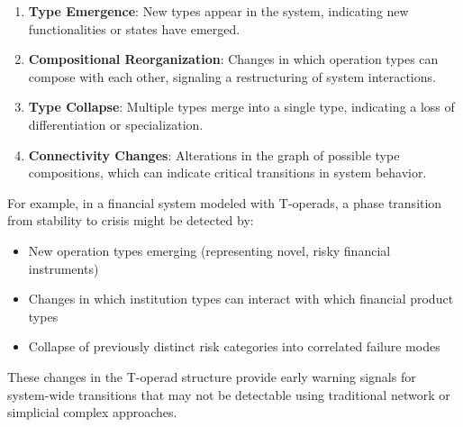 \begin{enumerate}
  \item \textbf{Type Emergence}: New types appear in the system, indicating new functionalities or states have emerged.

  \item \textbf{Compositional Reorganization}: Changes in which operation types can compose with each other, signaling a restructuring of system interactions.

  \item \textbf{Type Collapse}: Multiple types merge into a single type, indicating a loss of differentiation or specialization.

  \item \textbf{Connectivity Changes}: Alterations in the graph of possible type compositions, which can indicate critical transitions in system behavior.
\end{enumerate}

For example, in a financial system modeled with T-operads, a phase transition from stability to crisis might be detected by:
\begin{itemize}
  \item New operation types emerging (representing novel, risky financial instruments)
  \item Changes in which institution types can interact with which financial product types
  \item Collapse of previously distinct risk categories into correlated failure modes
\end{itemize}

These changes in the T-operad structure provide early warning signals for system-wide transitions that may not be detectable using traditional network or simplicial complex approaches.

